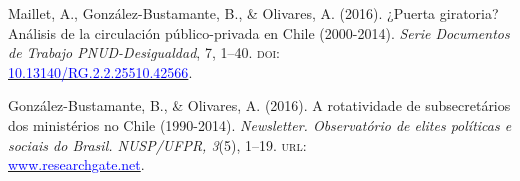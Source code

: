 
\begin{publications}

\begin{benumerate}{4}


\item{\small Maillet, A., González-Bustamante, B., \& Olivares, A. (2016). ¿Puerta giratoria? Análisis de la circulación público-privada en Chile (2000-2014). {\itshape Serie Documentos de Trabajo PNUD-Desigualdad}, 7, 1--40. {\scshape doi:} \\ \href{http://doi.org/10.13140/RG.2.2.25510.42566}{\textcolor{blue}{10.13140/RG.2.2.25510.42566}}.}\vspace{1mm}


\item{\small González-Bustamante, B., \& Olivares, A. (2016). A rotatividade de subsecretários dos ministérios no Chile (1990-2014). {\itshape Newsletter. Observat\'orio de elites pol\'iticas e sociais do Brasil. NUSP/UFPR, 3}(5), 1--19. {\scshape url:} \\ \href{https://www.researchgate.net/publication/321993740_A_rotatividade_de_subsecretarios_dos_ministerios_no_Chile_1990-2014}{\textcolor{blue}{www.researchgate.net}}.}\vspace{1mm}



\end{benumerate}
\end{publications}

